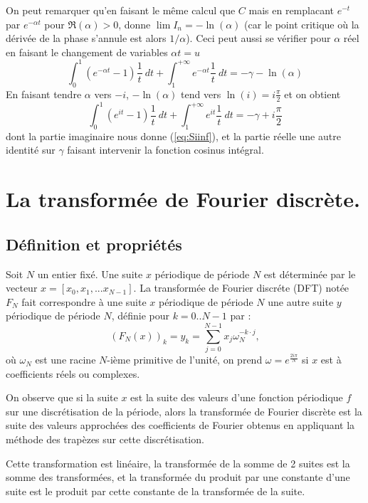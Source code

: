 \documentclass[a4paper,11pt]{article}
\begin{document}
\begin{giacjshere}
On peut remarquer qu'en faisant le m\^eme calcul que $C$ 
mais en remplacant $e^{-t}$ par $e^{-\alpha t}$ pour $\Re(\alpha)>0$, donne
$\lim I_n=-\ln(\alpha)$ (car le point critique o\`u la d\'eriv\'ee
de la phase s'annule est alors $1/\alpha$). Ceci peut aussi se v\'erifier
pour $\alpha$ r\'eel en faisant le changement de variables $\alpha t=u$
\[ \int_0^{1}(e^{-\alpha t}-1)\frac{1}{t} \ dt + \int_1^{+\infty} e^{-\alpha t} \frac{1}{t} \ dt 
= -\gamma -\ln(\alpha) \]
En faisant tendre $\alpha$ vers $-i$, $-\ln(\alpha)$ 
tend vers $\ln(i)=i\frac{\pi}{2}$ et on obtient
\[ \int_0^{1}(e^{it}-1)\frac{1}{t} \ dt + \int_1^{+\infty} e^{i t} \frac{1}{t} \ dt 
= -\gamma + i \frac{\pi}{2} \]
dont la partie imaginaire nous donne (\ref{eq:Siinf}), et la
partie r\'eelle une autre identit\'e sur $\gamma$ faisant intervenir
la fonction cosinus int\'egral.


\section{La transform\'ee de Fourier discr\`ete.}
\label{sec:dft}
\subsection{D\'efinition et propri\'et\'es}
Soit $N$ un entier fixé. Une suite $x$ p\'eriodique de p\'eriode $N$ est
d\'etermin\'ee par le vecteur $x=[x_0,x_1,...x_{N-1}]$.
La transform\'ee de Fourier discr\'ete (DFT) notée $F_N$ fait correspondre 
à une suite $x$ p\'eriodique de p\'eriode $N$ une autre suite $y$
p\'eriodique de p\'eriode $N$, d\'efinie pour $k=0..N-1$ par :
\[ 
{(F_N(x))}_k=y_k=\sum_{j=0}^{N-1} x_j \omega_N^{-k\cdot j},
\]
où $\omega_N$ est une racine $N$-i\`eme primitive de l'unit\'e,
on prend $\omega=e^{\frac{2i\pi}{N}}$ si $x$ est à coefficients réels
ou complexes.

On observe que si la suite $x$ est la suite des valeurs d'une fonction
p\'eriodique $f$ sur une discr\'etisation de la p\'eriode, alors
la transform\'ee de Fourier discr\`ete est la suite des valeurs approch\'ees
des coefficients de Fourier obtenus en appliquant la m\'ethode des
trap\`ezes sur cette discr\'etisation.

Cette transformation est linéaire, la transformée de la somme de 2
suites est la somme des transformées, et la transformée du produit
par une constante d'une suite 
est le produit par cette constante de la transformée
de la suite.


\end{giacjshere}
\end{document}

